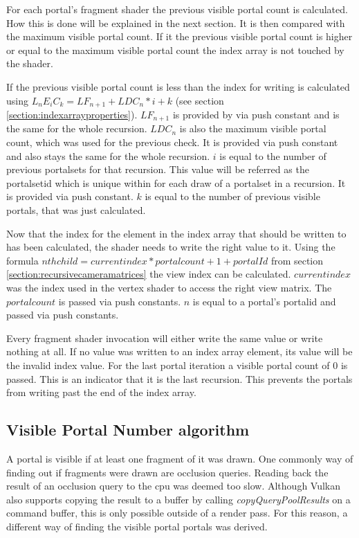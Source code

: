 For each portal's fragment shader the previous visible portal count is calculated. How this is done will be explained in the next section. It is then compared with the maximum visible portal count. If it the previous visible portal count is higher or equal to the maximum visible portal count the index array is not touched by the shader.

If the previous visible portal count is less than the index for writing is calculated using $L_nE_iC_k = LF_{n+1} + LDC_{n} * i + k$ (see section \ref{section:indexarrayproperties}). $LF_{n+1}$ is provided by via push constant and is the same for the whole recursion. $LDC_{n}$ is also the maximum visible portal count, which was used for the previous check. It is provided via push constant and also stays the same for the whole recursion. $i$ is equal to the number of previous \glspl{portalset} for that recursion. This value will be referred as the \gls{portalsetid} which is unique within for each draw of a \gls{portalset} in a recursion. It is provided via push constant. $k$ is equal to the number of previous visible portals, that was just calculated.

Now that the index for the element in the index array that should be written to has been calculated, the shader needs to write the right value to it. Using the formula $ nth child = current index * portalcount + 1 + portalId$ from section \ref{section:recursivecameramatrices} the view index can be calculated. $currentindex$ was the index used in the vertex shader to access the right view matrix. The $portalcount$ is passed via push constants. $n$ is equal to a portal's \gls{portalid} and passed via push constants.

Every fragment shader invocation will either write the same value or write nothing at all. If no value was written to an index array element, its value will be the invalid index value. For the last portal iteration a visible portal count of 0 is passed. This is an indicator that it is the last recursion. This prevents the portals from writing past the end of the index array.

\subsection{Visible Portal Number algorithm}
\label{section:visibleportalcount}
A portal is visible if at least one fragment of it was drawn. One commonly way of finding out if fragments were drawn are occlusion queries. Reading back the result of an occlusion query to the \gls{cpu} was deemed too slow. Although Vulkan also supports copying the result to a buffer by calling \textit{copyQueryPoolResults} on a command buffer, this is only possible outside of a render pass. For this reason, a different way of finding the visible portal portals was derived.

